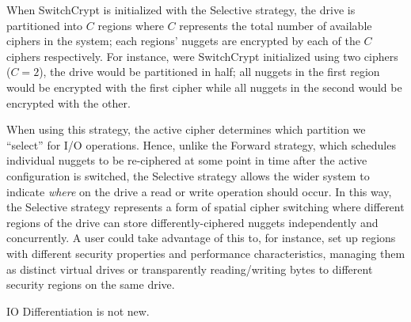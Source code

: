 When SwitchCrypt is initialized with the
Selective strategy, the drive is partitioned into $C$ regions where $C$
represents the total number of available ciphers in the system; each regions'
nuggets are encrypted by each of the $C$ ciphers respectively. For instance,
were SwitchCrypt initialized using two ciphers ($C = 2$), the drive would be
partitioned in half; all nuggets in the first region would be encrypted with the
first cipher while all nuggets in the second would be encrypted with the other.

When using this strategy, the active cipher determines which partition we
``select'' for I/O operations. Hence, unlike the Forward strategy, which
schedules individual nuggets to be re-ciphered at some point in time after the
active configuration is switched, the Selective strategy allows the wider system
to indicate \emph{where} on the drive a read or write operation should occur. In
this way, the Selective strategy represents a form of spatial cipher switching
where different regions of the drive can store differently-ciphered nuggets
independently and concurrently. A user could take advantage of this to, for
instance, set up regions with different security properties and performance
characteristics, managing them as distinct virtual drives or transparently
reading/writing bytes to different security regions on the same drive.


IO Differentiation is not new. 

